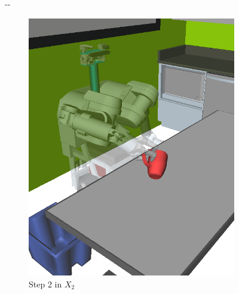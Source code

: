 \documentclass{report}
\newlength{\offsetpage}
\newenvironment{widepage}
   {\begin{adjustwidth}{-\offsetpage}{-\offsetpage}%
    \addtolength{\textwidth}{2\offsetpage}}%
{\end{adjustwidth}}
\begin{document}
{\begin{figure}
\begin{widepage}
\begin{center}
\begin{subfigure}[t]{0.19\linewidth}
\includegraphics[width=\columnwidth]{figs/testherb-c.png}
\caption{Step 2 in $X_2$}
\end{subfigure}
\begin{subfigure}[t]{0.19\linewidth}
\centering

\end{subfigure}
\end{center}
\end{widepage}
\end{figure}}
\end{document}
